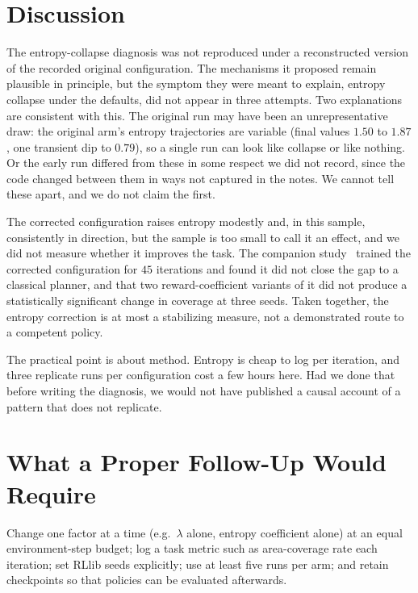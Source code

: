 \documentclass[12pt]{article}
\begin{document}
\section{Discussion}
The entropy-collapse diagnosis was not reproduced under a reconstructed version of the recorded original configuration. The mechanisms it
proposed remain plausible in principle, but the symptom they were meant to
explain, entropy collapse under the defaults, did not appear in three
attempts. Two explanations are consistent with this. The original run may
have been an unrepresentative draw: the original arm's entropy trajectories
are variable (final values $1.50$ to $1.87$, one transient dip to $0.79$),
so a single run can look like collapse or like nothing. Or the early run
differed from these in some respect we did not record, since the code
changed between them in ways not captured in the notes. We cannot tell these
apart, and we do not claim the first.

The corrected configuration raises entropy modestly and, in this sample,
consistently in direction, but the sample is too small to call it an
effect, and we did not measure whether it improves the task. The companion
study~\cite{pandhe2026mappo} trained the corrected configuration for $45$
iterations and found it did not close the gap to a classical planner, and
that two reward-coefficient variants of it did not produce a statistically
significant change in coverage at three seeds. Taken together, the
entropy correction is at most a stabilizing measure, not a demonstrated
route to a competent policy.

The practical point is about method. Entropy is cheap to log per iteration,
and three replicate runs per configuration cost a few hours here. Had we
done that before writing the diagnosis, we would not have published a causal
account of a pattern that does not replicate.

\section{What a Proper Follow-Up Would Require}
Change one factor at a time (e.g.\ $\lambda$ alone, entropy coefficient alone) at an equal environment-step budget; log a task metric such as area-coverage rate each iteration; set RLlib seeds explicitly; use at least five runs per arm; and retain checkpoints so that policies can be evaluated afterwards.
\end{document}
